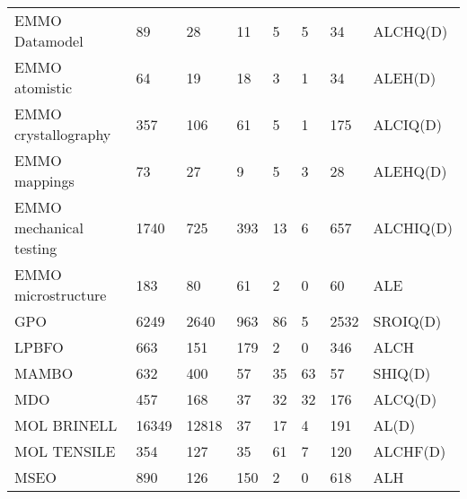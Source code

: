 \begin{table}
\begin{tabular}{m{3.5cm}m{1cm}m{1cm}m{1cm}m{1cm}m{1cm}m{1cm}m{1cm}}
EMMO Datamodel          &        89 &                28 &         11 &                    5 &                      5 &                       34 &         ALCHQ(D) \\
EMMO atomistic          &        64 &                19 &         18 &                    3 &                      1 &                       34 &          ALEH(D) \\
EMMO crystallography    &       357 &               106 &         61 &                    5 &                      1 &                      175 &         ALCIQ(D) \\
EMMO mappings           &        73 &                27 &          9 &                    5 &                      3 &                       28 &         ALEHQ(D) \\
EMMO mechanical testing &      1740 &               725 &        393 &                   13 &                      6 &                      657 &        ALCHIQ(D) \\
EMMO microstructure     &       183 &                80 &         61 &                    2 &                      0 &                       60 &              ALE \\
GPO                     &      6249 &              2640 &        963 &                   86 &                      5 &                     2532 &         SROIQ(D) \\
LPBFO                   &       663 &               151 &        179 &                    2 &                      0 &                      346 &             ALCH \\
MAMBO                   &       632 &               400 &         57 &                   35 &                     63 &                       57 &          SHIQ(D) \\
MDO                     &       457 &               168 &         37 &                   32 &                     32 &                      176 &          ALCQ(D) \\
MOL BRINELL             &     16349 &             12818 &         37 &                   17 &                      4 &                      191 &            AL(D) \\
MOL TENSILE             &       354 &               127 &         35 &                   61 &                      7 &                      120 &         ALCHF(D) \\
MSEO                    &       890 &               126 &        150 &                    2 &                      0 &                      618 &              ALH \\

\end{tabular}
\end{table}
